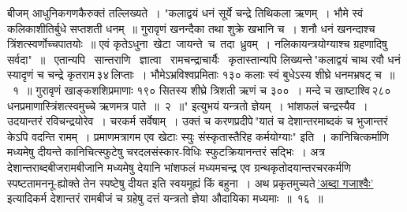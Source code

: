 \documentclass[11pt, openany]{book}
\begin{document}
\newpage

\noindent बीजम् {\color{violet}आधुनिकगणकै}रुक्तं तल्लिख्यते~। {\color{violet}"कलाद्वयं धनं सूर्ये चन्द्रे तिथिकला ऋणम्~। भौमे स्वं कलिकाशीतिर्बुधे सप्तशती धनम्~॥ गुरावृणं खनन्दैका तथा शुक्रे खभानि च~। शनौ धनं खनन्दाश्च त्रिंशत्स्वर्णोच्चपातयोः~॥ एवं कृतेऽधुना \,खेटा \,जायन्ते \,च \,तदा \,ध्रुवम्~। नलिकायन्त्रयोग्याश्च \;ग्रहणादिषु सर्वदा"~॥} ~एतान्यपि ~सान्तराणि ~ज्ञात्वा ~{\color{violet}रामचन्द्राचार्यैः} ~कृतास्तान्यपि लिख्यन्ते\textendash \,{\color{violet}"कलाद्वयं चाथ रवौ धनं स्यादृणं च चन्द्रे कृतराम\textendash \,३४\textendash \,लिप्ताः~। भौमेऽभ्रविश्वप्रमिताः १३० कलाः स्वं बुधेऽस्य शीघ्रे धनमभ्रषट् च~॥~१~॥ गुरावृणं खाङ्कशशिप्रमाणाः १९० सितस्य शीघ्रे त्रिशती ऋणं च ३००~। मन्दे च खाष्टाश्वि\textendash \,२८०\textendash \,धनप्रमाणास्त्रिंशत्स्वमुच्चे ऋणमत्र पाते~॥~२~॥"} इत्युभयं यन्त्रतो ज्ञेयम्~। भांशफलं चन्द्रस्यैव~। उदयान्तरं रविचन्द्रयोरेव~। चरकर्म सर्वेषाम्~। उक्तं च {\color{violet}करणप्रदीपे\textendash \,"यातं च देशान्तरमाब्दकं च भुजान्तरं केऽपि वदन्ति रामम्~। प्रमाणमत्रागम एव खेटाः स्युः संस्कृतास्तैरिह कर्मयोग्याः"} इति~। कानिचित्कर्माणि मध्यमेषु दीयन्ते कानिचित्स्फुटेषु चरदलसंस्कार-विधिः स्फुटक्रियानन्तरं सद्भिः~। अत्र देशान्तराब्दबीजरामबीजानि मध्यमेषु देयानि भांशफलं मध्यमचन्द्र एव ग्रन्थकृतोदयान्तरचरकर्मणि स्पष्टतामननू-ह्योक्ते तेन स्पष्टेषु दीयत इति स्वयमूह्यं किं बहुना~। अथ प्रकृतमुच्यते\textendash \,\hyperref[1.16]{'अब्दा गजाश्वैः'} इत्यादिकर्म देशान्तरं रामबीजं च ग्रहेषु दत्तं यन्त्रतो ज्ञेया औदायिका मध्यमाः~॥~१६~॥

\newpage
\end{document}
